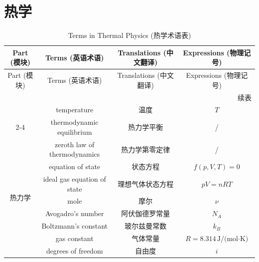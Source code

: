 \documentclass{article}
\begin{document}
\section{热学}
\begin{longtable}{|c|c|c|c|}
  \caption{Terms in Thermal Physics (热学术语表)} \label{Tab.2} \\
  \hline
  Part (模块) & Terms (英语术语) & Translations (中文翻译) & Expressions (物理记号) \\ 
  \hline
  \endfirsthead

  \hline
  Part (模块) & Terms (英语术语) & Translations (中文翻译) & Expressions (物理记号) \\ 
  \hline
  \endhead

  \hline
  \multicolumn{4}{r}{续表} \\
  \endfoot

  \hline
  \endlastfoot

  \multirow{2}{*}{热力学}
  & temperature & 温度 & $T$ \\
  \cline{2-4}
  & thermodynamic equilibrium & 热力学平衡 & / \\
  \hline
  \multirow{8}{*}{热力学}
  & zeroth law of thermodynamics & 热力学第零定律 & / \\
  \cline{2-4}
  & equation of state & 状态方程 & $f(p,V,T)=0$ \\
  \cline{2-4}
  & ideal gas equation of state & 理想气体状态方程 & $pV=nRT$ \\
  \cline{2-4}
  & mole & 摩尔 & $\nu$ \\
  \cline{2-4}
  & Avogadro's number & 阿伏伽德罗常量 & $N_A$ \\
  \cline{2-4}
  & Boltzmann's constant & 玻尔兹曼常数 & $k_B$ \\
  \cline{2-4}
  & gas constant & 气体常量 & $R=8.314\,\text{J/(mol·K)}$ \\
  \cline{2-4}
  & degrees of freedom & 自由度 & $i$ \\
  \hline


\end{longtable}
\end{document}
